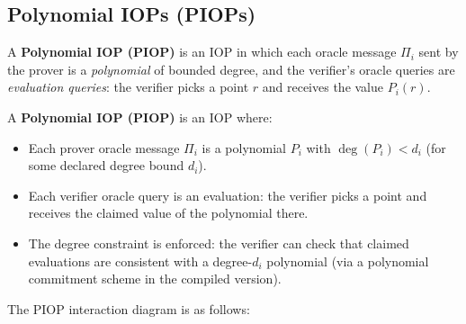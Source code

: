 \documentclass[11pt]{article}
\theoremstyle{plain}
\theoremstyle{definition}
\begin{document}
\subsection{Polynomial IOPs (PIOPs)}

A \textbf{Polynomial IOP (PIOP)} is an IOP in which each oracle message $\Pi_i$
sent by the prover is a \emph{polynomial} of bounded degree, and the verifier's
oracle queries are \emph{evaluation queries}: the verifier picks a point $r$ and
receives the value $P_i(r)$.

\begin{defbox}
A \textbf{Polynomial IOP (PIOP)} is an IOP where:
\begin{itemize}
  \item Each prover oracle message $\Pi_i$ is a polynomial $P_i$ with
    $\deg(P_i) < d_i$ (for some declared degree bound $d_i$).
  \item Each verifier oracle query is an evaluation: the verifier picks a point
    and receives the claimed value of the polynomial there.
  \item The degree constraint is enforced: the verifier can check that claimed
    evaluations are consistent with a degree-$d_i$ polynomial (via a polynomial
    commitment scheme in the compiled version).
\end{itemize}
\end{defbox}

The PIOP interaction diagram is as follows:
\end{document}
